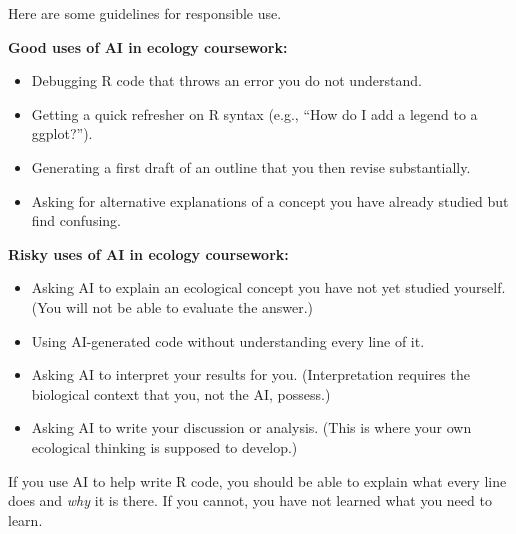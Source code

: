 \documentclass[
  letterpaper,
  DIV=11,
  numbers=noendperiod]{scrreprt}
\providecommand{\tightlist}{%
  \setlength{\itemsep}{0pt}\setlength{\parskip}{0pt}}
\begin{document}
Here are some guidelines for responsible use.

\textbf{Good uses of AI in ecology coursework:}

\begin{itemize}
\tightlist
\item
  Debugging R code that throws an error you do not understand.
\item
  Getting a quick refresher on R syntax (e.g., ``How do I add a legend
  to a ggplot?'').
\item
  Generating a first draft of an outline that you then revise
  substantially.
\item
  Asking for alternative explanations of a concept you have already
  studied but find confusing.
\end{itemize}

\textbf{Risky uses of AI in ecology coursework:}

\begin{itemize}
\tightlist
\item
  Asking AI to explain an ecological concept you have not yet studied
  yourself. (You will not be able to evaluate the answer.)
\item
  Using AI-generated code without understanding every line of it.
\item
  Asking AI to interpret your results for you. (Interpretation requires
  the biological context that you, not the AI, possess.)
\item
  Asking AI to write your discussion or analysis. (This is where your
  own ecological thinking is supposed to develop.)
\end{itemize}

\begin{tcolorbox}[enhanced jigsaw, toprule=.15mm, colframe=quarto-callout-warning-color-frame, bottomrule=.15mm, arc=.35mm, breakable, leftrule=.75mm, rightrule=.15mm, bottomtitle=1mm, coltitle=black, left=2mm, titlerule=0mm, title=\textcolor{quarto-callout-warning-color}{\faExclamationTriangle}\hspace{0.5em}{The Code Comprehension Rule}, toptitle=1mm, colbacktitle=quarto-callout-warning-color!10!white, opacityback=0, colback=white, opacitybacktitle=0.6]

If you use AI to help write R code, you should be able to explain what
every line does and \emph{why} it is there. If you cannot, you have not
learned what you need to learn.

\end{tcolorbox}
\end{document}
